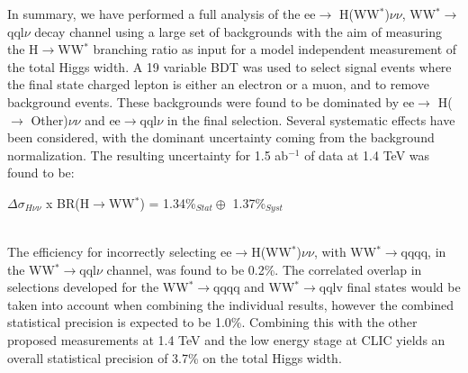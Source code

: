 In summary, we have performed a full analysis of the ee$\rightarrow$ H(WW$^*$)$\nu\nu$, WW$^*\rightarrow$qql$\nu$ decay channel using a large set of backgrounds with the aim of measuring the H$\rightarrow$WW$^*$ branching ratio as input for a model independent measurement of the total Higgs width. A 19 variable BDT was used to select signal events where the final state charged lepton is either an electron or a muon, and to remove background events. These backgrounds were found to be dominated by ee$\rightarrow$ H($\rightarrow$ Other)$\nu\nu$  and ee$\rightarrow$qql$\nu$ in the final selection. Several systematic effects have been considered, with the dominant uncertainty coming from the background normalization. The resulting uncertainty for 1.5 ab$^{-1}$ of data at 1.4 TeV was found to be: \\[10pt]\centerline{\large{$\Delta\sigma_{H\nu\nu}$ x BR(H$\rightarrow$WW$^*$) = 1.34\%$_{Stat} \oplus$ 1.37\%$_{Syst}$}} \\[10pt] The efficiency for incorrectly selecting ee$\rightarrow$H(WW$^*$)$\nu\nu$, with WW$^*\rightarrow$qqqq, in the WW$^*\rightarrow$qql$\nu$ channel, was found to be 0.2\%. The correlated overlap in selections developed for the WW$^*\rightarrow$qqqq and WW$^*\rightarrow$qqlv final states would be taken into account when combining the individual results, however the combined statistical precision is expected to be 1.0\%. Combining this with the other proposed measurements at 1.4 TeV and the low energy stage at CLIC yields an overall statistical precision of 3.7\% on the total Higgs width.




